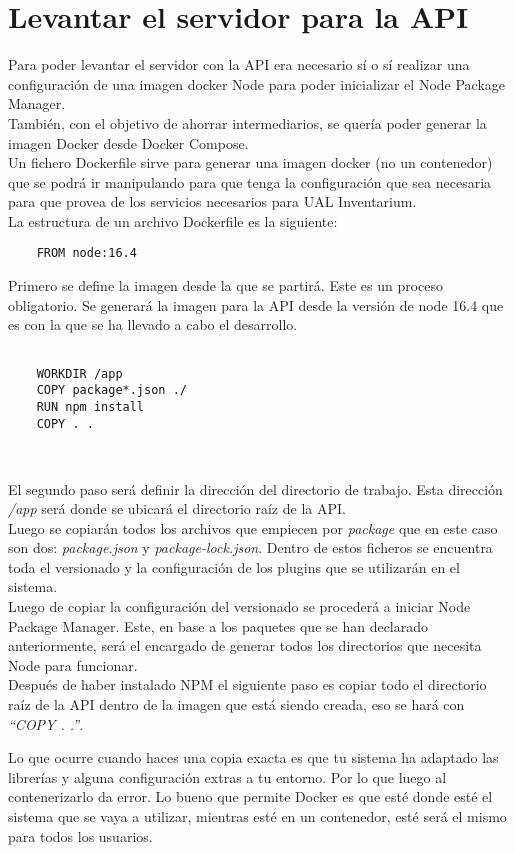 \section{Levantar el servidor para la API}
Para poder levantar el servidor con la API era necesario sí o sí realizar una configuración de una imagen docker Node para poder inicializar el Node Package Manager.
\\También, con el objetivo de ahorrar intermediarios, se quería poder generar la imagen Docker desde Docker Compose.
\\Un fichero Dockerfile sirve para generar una imagen docker (no un contenedor) que se podrá ir manipulando para que tenga la configuración que sea necesaria para que provea de los servicios necesarios para UAL Inventarium.
\\La estructura de un archivo Dockerfile es la siguiente:
\begin{verbatim}
    FROM node:16.4
\end{verbatim}
Primero se define la imagen desde la que se partirá. Este es un proceso obligatorio. Se generará la imagen para la API desde la versión de node 16.4 que es con la que se ha llevado a cabo el desarrollo.
\begin{verbatim}

    WORKDIR /app
    COPY package*.json ./
    RUN npm install
    COPY . .

    
\end{verbatim}
El segundo paso será definir la dirección del directorio de trabajo. Esta dirección \textit{/app} será donde se ubicará el directorio raíz de la API.
\\Luego se copiarán todos los archivos que empiecen por \textit{package} que en este caso son dos: \textit{package.json} y \textit{package-lock.json}. Dentro de estos ficheros se encuentra toda el versionado y la configuración de los plugins que se utilizarán en el sistema.
\\Luego de copiar la configuración del versionado se procederá a iniciar Node Package Manager. Este, en base a los paquetes que se han declarado anteriormente, será el encargado de generar todos los directorios que necesita Node para funcionar.
\\Después de haber instalado NPM el siguiente paso es copiar todo el directorio raíz de la API dentro de la imagen que está siendo creada, eso se hará con \textit{``COPY . .''}.
\begin{tcolorbox}
    [colback=green!5!white,colframe=green!75!black,fonttitle=\bfseries,title=¿Por qué no se copia directamente el directorio raíz con los plugins y demás?]
    Lo que ocurre cuando haces una copia exacta es que tu sistema ha adaptado las librerías y alguna configuración extras a tu entorno. Por lo que luego al contenerizarlo da error. Lo bueno que permite Docker es que esté donde esté el sistema que se vaya a utilizar, mientras esté en un contenedor, esté será el mismo para todos los usuarios.
\end{tcolorbox}
